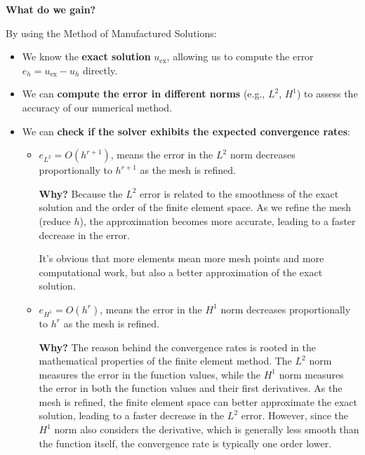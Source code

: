 \highspace
\begin{flushleft}
    \textcolor{Green3}{ \textbf{What do we gain?}}
\end{flushleft}
By using the Method of Manufactured Solutions:
\begin{itemize}
    \item We know the \textbf{exact solution} $u_\text{ex}$, allowing us to compute the error $e_h = u_\text{ex} - u_h$ directly.
    \item We can \textbf{compute the error in different norms} (e.g., $L^2$, $H^1$) to assess the accuracy of our numerical method.
    \item We can \textbf{check if the solver exhibits the expected convergence rates}:
    \begin{itemize}
        \item $e_{L^2} = O\left(h^{r+1}\right)$, means the error in the $L^2$ norm decreases proportionally to $h^{r+1}$ as the mesh is refined.
        
        \textcolor{Green3}{ \textbf{Why?}} Because the $L^2$ error is related to the smoothness of the exact solution and the order of the finite element space. As we refine the mesh (reduce $h$), the approximation becomes more accurate, leading to a faster decrease in the error.

        It's obvious that more elements mean more mesh points and more computational work, but also a better approximation of the exact solution.


        \item $e_{H^1} = O\left(h^r\right)$, means the error in the $H^1$ norm decreases proportionally to $h^r$ as the mesh is refined.
        
        \textcolor{Green3}{ \textbf{Why?}} The reason behind the convergence rates is rooted in the mathematical properties of the finite element method. The $L^2$ norm measures the error in the function values, while the $H^1$ norm measures the error in both the function values and their first derivatives. As the mesh is refined, the finite element space can better approximate the exact solution, leading to a faster decrease in the $L^2$ error. However, since the $H^1$ norm also considers the derivative, which is generally less smooth than the function itself, the convergence rate is typically one order lower.
    \end{itemize}
\end{itemize}

